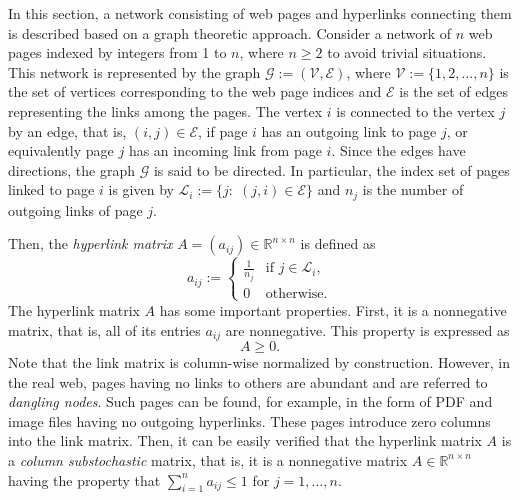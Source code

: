 \documentclass[11pt,draftcls,onecolumn]{IEEEtran}
\newcommand{\field}[1]{{\mathbb{#1}}}
\newcommand{\R}{\field{R}}
\begin{document}
In this section, a network consisting of web pages and hyperlinks connecting them
is described based on a graph theoretic approach.
Consider a network of $n$ web pages indexed by integers from 1 to $n$, where
$n\geq 2$ to avoid trivial situations.
This network is represented by the graph $\mathcal{G}:=(\mathcal{V},\mathcal{E})$,
where $\mathcal{V}:=\{1,2,\ldots,n\}$ is the set of vertices corresponding 
to the web page indices and $\mathcal{E}$ is the set of edges representing
the links among the pages. 
The vertex $i$ is connected to the vertex $j$ by an edge, that is,
$(i,j)\in \mathcal{E}$, if page $i$ has an outgoing link to page $j$,
or equivalently page $j$ has an incoming link from page $i$.
Since the edges have directions, the graph $\mathcal{G}$ is said to be directed.
In particular, the index set of pages linked to page $i$ is given by $\mathcal{L}_i:=\{j:\; (j,i)\in\mathcal{E}\}$ and $n_j$ is the number of outgoing links of page $j$. 

Then, the {\it hyperlink matrix} $A=(a_{ij})\in\R^{n\times n}$ is defined as
\begin{equation}
 a_{ij} 
  := \begin{cases}
      \frac{1}{n_j} & \text{if $j\in \mathcal{L}_i$},\\
      0             & \text{otherwise}.
    \end{cases}
 \label{eqn:A}
\end{equation}
The hyperlink matrix $A$ has some important properties. First, it is a nonnegative matrix, 
that is, all of its entries  $a_{ij}$ are nonnegative. This property is expressed as
$$
A\geq 0.
$$
Note that the link matrix is column-wise normalized by construction. 
However, in the real web, pages having no links to others are abundant and
are referred to {\it dangling nodes}. 
Such pages can be found, for example, in the form of PDF and image files
having no outgoing hyperlinks. These pages introduce zero columns into the link matrix. 
Then, it can be easily verified that the 
hyperlink matrix $A$ is a {\it column substochastic} matrix, that is, 
it is a nonnegative matrix $A\in \R^{n\times n}$ having  
the property that $\sum_{i=1}^n a_{ij} \le1$ for $j=1,\ldots,n$.
\end{document}
